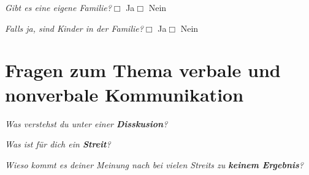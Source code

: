 \documentclass[a4paper,12pt]{scrartcl}
\newcommand{\checkbox}{\(\Box\)}
\newcommand{\hfilloutline}[1]{\rule{#1}{0.5pt}}
\newcommand{\frage}[1]{\textit{#1}}
\renewcommand{\emph}[1]{\textbf{#1}}
\begin{document}
\frage{Gibt es eine eigene Familie?}\hfill \checkbox{} Ja\hspace{0.8cm}\checkbox{} Nein\par
\frage{Falls ja, sind Kinder in der Familie?}\hfill \checkbox{} Ja\hspace{0.8cm}\checkbox{} Nein
\newpage







\section*{Fragen zum Thema verbale und nonverbale Kommunikation}

\frage{Was verstehst du unter einer \emph{Disskusion}?}
\vspace{3cm}

\frage{Was ist für dich ein \emph{Streit}?}
\vspace{3cm}

\frage{Wieso kommt es deiner Meinung nach bei vielen Streits zu \emph{keinem Ergebnis}?}
\vspace{3cm}
\end{document}
